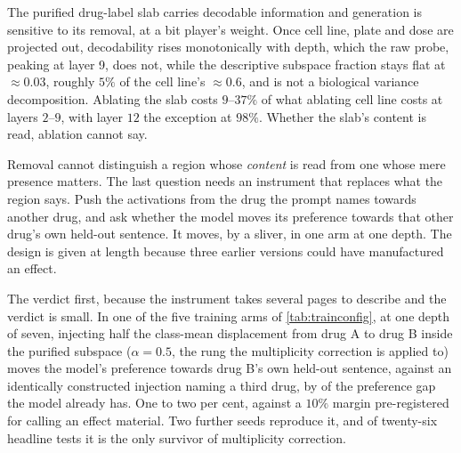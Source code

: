 \begin{claim}
The purified drug-label slab carries decodable information and generation is
sensitive to its removal, at a bit player's weight. Once cell line, plate and
dose are projected out, decodability rises monotonically with depth, which the
raw probe, peaking at layer 9, does not, while the descriptive subspace fraction
stays flat at $\approx 0.03$, roughly $5\%$ of the cell line's $\approx 0.6$, and
is not a biological variance decomposition. Ablating the slab costs $9$--$37\%$
of what ablating cell line costs at layers $2$--$9$, with layer $12$ the
exception at $98\%$. Whether the slab's content is read, ablation cannot say.
\end{claim}


\begin{question}[3]
Removal cannot distinguish a region whose \emph{content} is read from one whose
mere presence matters. The last question needs an instrument that replaces what
the region says. Push the activations from the drug the prompt names towards
another drug, and ask whether the model moves its preference towards that other
drug's own held-out sentence. It moves, by a sliver, in one arm at one depth. The
design is given at length because three earlier versions could have manufactured
an effect.
\end{question}

\noindent
The verdict first, because the instrument takes several pages to describe and the
verdict is small. In one of the five training arms of \cref{tab:trainconfig}, at
one depth of seven, injecting half the class-mean displacement from drug A to
drug B inside
the purified subspace ($\alpha = 0.5$, the rung the multiplicity correction is
applied to) moves the model's preference towards drug B's own held-out sentence,
against an identically constructed injection naming a third drug, by
 of the preference gap the model already has. One
to two per cent, against a $10\%$ margin pre-registered for calling an effect
material. Two further seeds reproduce it, and of twenty-six headline tests it is
the only survivor of multiplicity correction.

